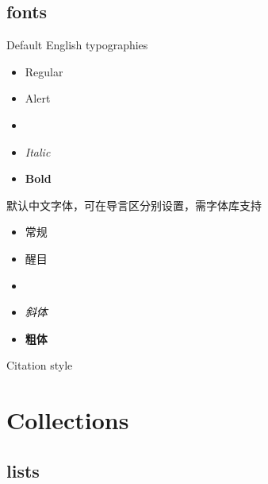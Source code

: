 \documentclass[9pt,aspectratio=169]{ctexbeamer}
\begin{document}
\subsection{fonts}
\begin{frame}[fragile]{\secname}{\subsecname}
  \begin{minipage}{0.35\textwidth}
    Default English typographies
    \begin{itemize}
      \item Regular
      \item \alert{Alert}
      \item {}
      \item \textit{Italic}
      \item \textbf{Bold}
    \end{itemize}
  \end{minipage}
  \vspace{0.5cm}
  \begin{minipage}{0.55\textwidth}
    默认中文字体，可在导言区分别设置，需字体库支持
    \begin{itemize}
      \item 常规
      \item \alert{醒目}
      \item {}
      \item \textit{斜体}
      \item \textbf{粗体}
    \end{itemize}
  \end{minipage}
  
  Citation style \cite{book} \cite{inbook}
 \end{frame}


\section{Collections}
\subsection{lists}
\end{document}
